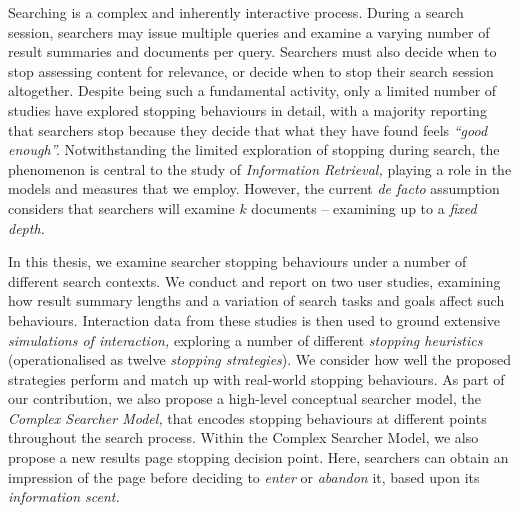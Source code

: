 
\begin{preamble}
{}

Searching is a complex and inherently interactive process. During a search session, searchers may issue multiple queries and examine a varying number of result summaries and documents per query. Searchers must also decide when to stop assessing content for relevance, or decide when to stop their search session altogether. Despite being such a fundamental activity, only a limited number of studies have explored stopping behaviours in detail, with a majority reporting that searchers stop because they decide that what they have found feels \emph{``good enough''.} Notwithstanding the limited exploration of stopping during search, the phenomenon is central to the study of \emph{Information Retrieval,} playing a role in the models and measures that we employ. However, the current \emph{de facto} assumption considers that searchers will examine $k$ documents -- examining up to a \emph{fixed depth.}

In this thesis, we examine searcher stopping behaviours under a number of different search contexts. We conduct and report on two user studies, examining how result summary lengths and a variation of search tasks and goals affect such behaviours. Interaction data from these studies is then used to ground extensive \emph{simulations of interaction,}  exploring a number of different \emph{stopping heuristics} (operationalised as twelve \emph{stopping strategies}). We consider how well the proposed strategies perform and match up with real-world stopping behaviours. As part of our contribution, we also propose a high-level conceptual searcher model, the \emph{Complex Searcher Model,} that encodes stopping behaviours at different points throughout the search process. Within the Complex Searcher Model, we also propose a new results page stopping decision point. Here, searchers can obtain an impression of the page before deciding to \emph{enter} or \emph{abandon} it, based upon its \emph{information scent.}


\end{preamble}
